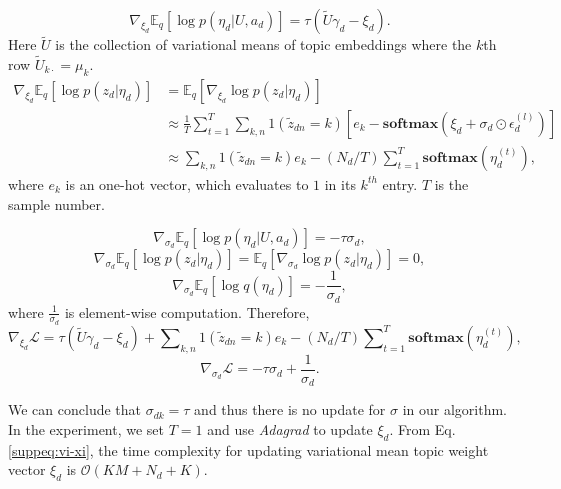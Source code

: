 \documentclass[sigconf]{acmart}
\newcommand{\eqtref}[1]{Eq.\eqref{#1}}
\renewcommand*{\bm}[1]{#1}%
\begin{document}
\begin{appendices}
\begin{equation}
\label{ }
\nabla_{\bm{\xi}_d}\mathbb{E}_q\left[\log p(\bm{\eta}_d | \bm{U}, \bm{a}_d)\right] = \tau(\tilde{\bm{U}}\bm{\gamma}_d - \bm{\xi}_d).
\end{equation}
Here $\tilde{\bm{U}}$ is the collection of variational means of topic embeddings
where the $k$th row $\tilde{\bm{U}}_{k\cdot}=\bm{\mu}_k$.
\begin{equation}
\label{ }
\begin{split}
\nabla_{\bm{\xi}_d}\mathbb{E}_q\left[\log p(\bm{z}_d | \bm{\eta}_d) \right] &= \mathbb{E}_q\left[\nabla_{\bm{\xi}_d}\log p(\bm{z}_d | \bm{\eta}_d) \right] \\
&\approx \frac{1}{T}\sum\nolimits_{t=1}^T\sum\nolimits_{k, n}\bm{1}(\tilde{z}_{dn} = k)\left[\bm{e}_k - \textbf{softmax}(\bm{\xi}_d + \bm{\sigma}_d \odot \bm{\epsilon}_d^{(l)})\right] \\
&\approx \sum\nolimits_{k,n}\bm{1}(\tilde{z}_{dn}=k) \bm{e}_k - (N_d/T)\sum\nolimits_{t=1}^{T}\textbf{softmax}\left(\bm{\eta}_{d}^{(t)}\right),
\end{split} 
\end{equation}
where $\bm{e}_k$ is an one-hot vector, which evaluates to $1$ in its $k^{th}$ entry. $T$ is the sample number.

\begin{equation}
\label{ }
\nabla_{\bm{\sigma}_d}\mathbb{E}_q\left[\log p(\bm{\eta}_d | \bm{U}, \bm{a}_d)\right] = -\tau\bm{\sigma}_d,
\end{equation}
\begin{equation}
\label{ }
\nabla_{\bm{\sigma}_d}\mathbb{E}_q\left[\log p(\bm{z}_d | \bm{\eta}_d) \right] = \mathbb{E}_q\left[\nabla_{\bm{\sigma}_d}\log p(\bm{z}_d | \bm{\eta}_d) \right] = \bm{0},
\end{equation}
\begin{equation}
\label{suppeq:vi-xi}
\nabla_{\bm{\sigma}_d}\mathbb{E}_q\left[\log q(\bm{\eta}_d) \right] = -\frac{\bm{1}}{\bm{\sigma}_d},
\end{equation}
where $\frac{\bm{1}}{\bm{\sigma}_d}$ is element-wise computation. Therefore,
\begin{equation}
\label{suppeq:vi-xi}
\nabla_{\bm{\xi}_d}\mathcal{L} = \tau(\tilde{\bm{U}}\bm{\gamma}_d - \bm{\xi}_d) + 
\sum\nolimits_{k,n}\bm{1}(\tilde{z}_{dn}=k) \bm{e}_k - (N_d/T)\sum\nolimits_{t=1}^{T}\textbf{softmax}\left(\bm{\eta}_{d}^{(t)}\right),
\end{equation}
\begin{equation}
\label{ }
\nabla_{\bm{\sigma}_d}\mathcal{L} = -\tau\bm{\sigma}_d + \frac{\bm{1}}{\bm{\sigma}_d}.
\end{equation}

We can conclude that $\sigma_{dk} = \tau$ and thus there is no update for $\bm{\sigma}$ in our algorithm. In the experiment, we set $T =1 $ and use \textit{Adagrad} to update $\bm{\xi}_d$. From \eqtref{suppeq:vi-xi}, the time complexity for updating variational mean topic weight vector $\bm{\xi}_d$ is $\mathcal{O}(KM + N_d + K)$.

\end{appendices}
\end{document}
